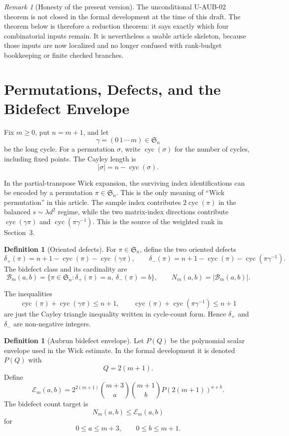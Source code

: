 \documentclass[11pt]{article}
\theoremstyle{plain}
\theoremstyle{definition}
\newtheorem{definition}[theorem]{Definition}
\theoremstyle{remark}
\newtheorem{remark}[theorem]{Remark}
\DeclareMathOperator{\cyc}{cyc}
\newcommand{\Sym}{\mathfrak S}
\newcommand{\g}{\gamma}
\newcommand{\p}{\pi}
\newcommand{\defp}{\delta_{+}}
\newcommand{\defm}{\delta_{-}}
\newcommand{\Env}{\mathcal E}
\begin{document}
\begin{remark}[Honesty of the present version]
The unconditional U-AUB-02 theorem is not closed in the formal development at
the time of this draft.  The theorem below is therefore a reduction theorem:
it says exactly which four combinatorial inputs remain.  It is nevertheless a
usable article skeleton, because those inputs are now localized and no longer
confused with rank-budget bookkeeping or finite checked branches.
\end{remark}

\section{Permutations, Defects, and the Bidefect Envelope}

Fix \(m\geq 0\), put \(n=m+1\), and let
\[
  \g=(0\,1\,\cdots\,m)\in\Sym_n
\]
be the long cycle.  For a permutation \(\sigma\), write \(\cyc(\sigma)\) for
the number of cycles, including fixed points.  The Cayley length is
\[
  |\sigma|=n-\cyc(\sigma).
\]

In the partial-transpose Wick expansion, the surviving index identifications
can be encoded by a permutation \(\p\in\Sym_n\).  This is the only meaning of
``Wick permutation'' in this article.  The sample index contributes
\(2\cyc(\p)\) in the balanced \(s\sim \lambda d^2\) regime, while the two
matrix-index directions contribute \(\cyc(\g\p)\) and \(\cyc(\p\g^{-1})\).
This is the source of the weighted rank in Section~3.

\begin{definition}[Oriented defects]
For \(\p\in\Sym_n\), define the two oriented defects
\[
  \defp(\p) = n+1-\cyc(\p)-\cyc(\g\p),
  \qquad
  \defm(\p) = n+1-\cyc(\p)-\cyc(\p\g^{-1}).
\]
The bidefect class and its cardinality are
\[
  \mathcal B_m(a,b)
  =
  \{\p\in\Sym_n:\defp(\p)=a,\ \defm(\p)=b\},
  \qquad
  N_m(a,b)=|\mathcal B_m(a,b)|.
\]
\end{definition}

The inequalities
\[
  \cyc(\p)+\cyc(\g\p)\leq n+1,
  \qquad
  \cyc(\p)+\cyc(\p\g^{-1})\leq n+1
\]
are just the Cayley triangle inequality written in cycle-count form.  Hence
\(\defp\) and \(\defm\) are non-negative integers.

\begin{definition}[Aubrun bidefect envelope]
Let \(P(Q)\) be the polynomial scalar envelope used in the Wick estimate.  In
the formal development it is denoted \(P(Q)\) with
\[
  Q=2(m+1).
\]
Define
\[
  \Env_m(a,b)
  =
  2^{2(m+1)}
  \binom{m+3}{a}
  \binom{m+1}{b}
  P(2(m+1))^{a+b}.
\]
The bidefect count target is
\[
  N_m(a,b)\leq \Env_m(a,b)
\]
for
\[
  0\leq a\leq m+3,\qquad 0\leq b\leq m+1.
\]
\end{definition}
\end{document}
